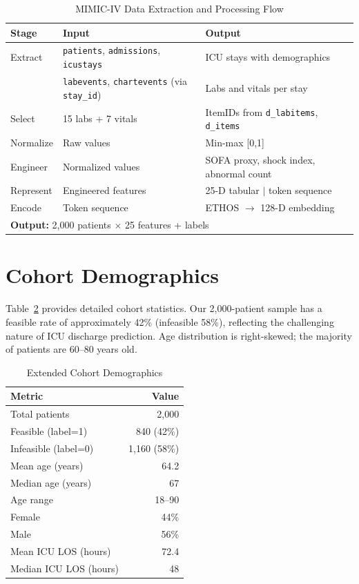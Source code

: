 \begin{table}[htbp]
\centering
\caption{MIMIC-IV Data Extraction and Processing Flow}
\small
\begin{tabular}{llp{5cm}}
\toprule
Stage & Input & Output \\
\midrule
Extract & \texttt{patients}, \texttt{admissions}, \texttt{icustays} & ICU stays with demographics \\
 & \texttt{labevents}, \texttt{chartevents} (via \texttt{stay\_id}) & Labs and vitals per stay \\
Select & 15 labs + 7 vitals & ItemIDs from \texttt{d\_labitems}, \texttt{d\_items} \\
Normalize & Raw values & Min-max [0,1] \\
Engineer & Normalized values & SOFA proxy, shock index, abnormal count \\
Represent & Engineered features & 25-D tabular $\mid$ token sequence \\
Encode & Token sequence & ETHOS $\to$ 128-D embedding \\
\midrule
\multicolumn{3}{l}{\textbf{Output:} 2,000 patients $\times$ 25 features + labels} \\
\bottomrule
\end{tabular}
\label{tab:mimic_flow}
\end{table}

\section{Cohort Demographics}

Table~\ref{tab:cohort_demographics_extended} provides detailed cohort statistics. Our 2,000-patient sample has a feasible rate of approximately 42\% (infeasible 58\%), reflecting the challenging nature of ICU discharge prediction. Age distribution is right-skewed; the majority of patients are 60--80 years old.

\begin{table}[htbp]
\centering
\caption{Extended Cohort Demographics}
\begin{tabular}{lr}
\toprule
Metric & Value \\
\midrule
Total patients & 2,000 \\
Feasible (label=1) & 840 (42\%) \\
Infeasible (label=0) & 1,160 (58\%) \\
Mean age (years) & 64.2 \\
Median age (years) & 67 \\
Age range & 18--90 \\
Female & 44\% \\
Male & 56\% \\
Mean ICU LOS (hours) & 72.4 \\
Median ICU LOS (hours) & 48 \\
\bottomrule
\end{tabular}
\label{tab:cohort_demographics_extended}
\end{table}

